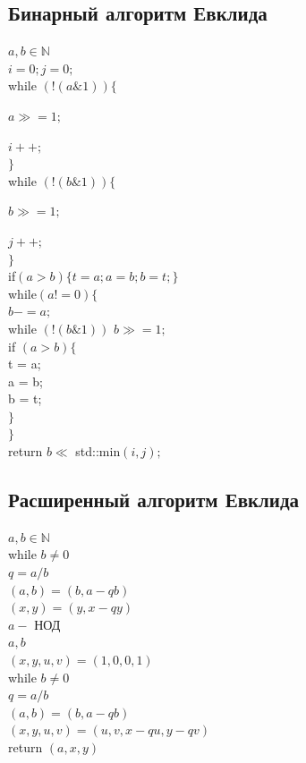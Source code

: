 \documentclass[12pt]{article}
\begin{document}
\subsection{Бинарный алгоритм Евклида}
\noindent $a, b \in \mathbb{N}$\\
$i = 0; j = 0;$\\
while $(!(a \& 1))\{$
\par $a \gg = 1;$
\par $i++;$\\ $\}$\\
while $(!(b \& 1))\{$
\par $b \gg = 1;$
\par $j++;$\\ $\}$\\
if$(a > b) \{ t = a; a = b; b = t;\}$\\
while$(a != 0)\{$\\
\indent $b -= a;$\\
\indent while $(!(b \& 1))$ $b \gg = 1;$\\
\indent if $(a > b)\{$\\
\indent\indent t = a;\\
\indent\indent a = b;\\
\indent\indent b = t;\\
\indent $\}$\\
$\}$\\
return $b \ll$ std::min$(i, j);$



\subsection{Расширенный алгоритм Евклида}
\noindent $a, b \in \mathbb{N}$\\
while $b \ne 0$\\
\indent $q = a / b$\\
\indent $(a, b) = (b, a - qb)$\\
\indent $(x, y) = (y, x - qy)$\\
\indent $a - $ НОД\\
\indent $a, b$\\
\indent $(x, y, u, v) = (1, 0, 0, 1)$\\
while $b \ne 0$\\
\indent $q = a / b$\\
\indent $(a, b) = (b, a - qb)$\\
\indent $(x, y, u, v) = (u, v, x - qu, y - qv)$\\
return $(a, x, y)$
\end{document}
